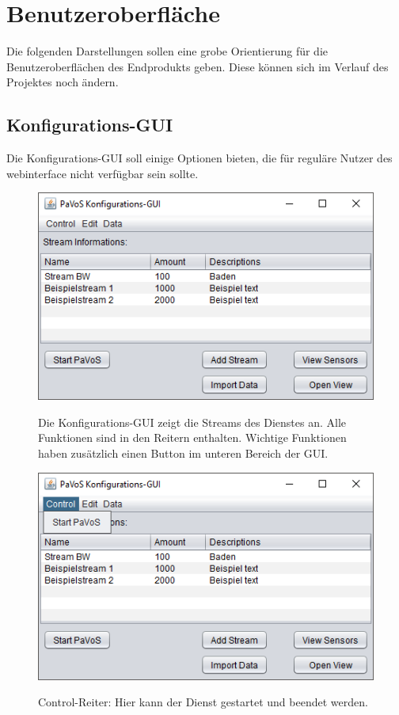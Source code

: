 \chapter{Benutzeroberfläche}
Die folgenden Darstellungen sollen eine grobe Orientierung für die Benutzeroberflächen des Endprodukts geben. Diese können sich im Verlauf des Projektes noch ändern.
\section{Konfigurations-GUI}
Die Konfigurations-GUI soll einige Optionen bieten, die für reguläre Nutzer des \gls{webinterface} nicht verfügbar sein sollte.

\begin{figure}[H]
	\centering
		\includegraphics[width=0.6\linewidth]{gui/backend/BackendGUIMain.png}\\
	\caption{Die Konfigurations-GUI zeigt die Streams des Dienstes an. Alle Funktionen sind in den Reitern enthalten. Wichtige Funktionen haben zusätzlich einen Button im unteren Bereich der GUI.}
\end{figure}

\begin{figure}[H]
	\centering
		\includegraphics[width=0.6\linewidth]{gui/backend/BackendGUIMenu1.png}\\
	\caption{Control-Reiter: Hier kann der Dienst gestartet und beendet werden.}
\end{figure}

